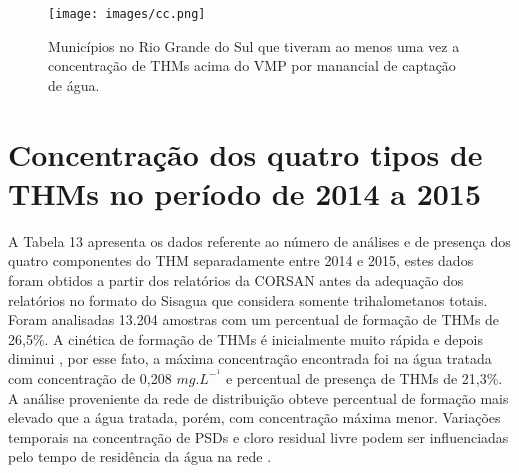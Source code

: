 \begin{table}[!htb]
    \label{tab01}
\end{table}


\begin{figure}[!htb]
\caption{Municípios no Rio Grande do Sul que tiveram ao menos uma vez a concentração de THMs acima do VMP por manancial de captação de água.}
\centering
\texttt{[image: images/cc.png]}
\label{fig04}
\end{figure}



\newpage

\section{Concentração dos quatro tipos de THMs no período de 2014 a 2015
}

A Tabela 13 apresenta os dados referente ao número de análises e de presença dos quatro componentes do THM separadamente entre 2014 e 2015, estes dados foram obtidos a partir dos relatórios da CORSAN antes da adequação dos relatórios no formato do Sisagua que considera somente trihalometanos totais. Foram analisadas 13.204 amostras com um percentual de formação de THMs de 26,5\%. A cinética de formação de THMs é inicialmente muito rápida e depois diminui \cite{mouly2010variations}, por esse fato, a máxima concentração encontrada foi na água tratada com concentração de 0,208 $mg.L^-^1$ e percentual de presença de THMs de 21,3\%. A análise proveniente da rede de distribuição obteve percentual de formação mais elevado que a água tratada, porém, com concentração máxima menor. Variações temporais na concentração de PSDs e cloro residual livre podem ser influenciadas pelo tempo de residência da água na rede \cite{mouly2010variations}.


